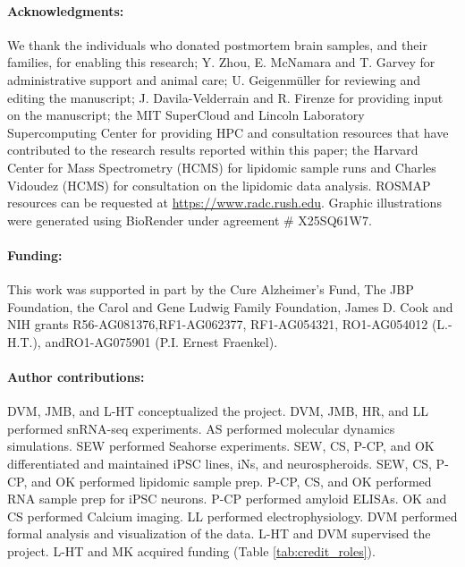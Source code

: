 \paragraph{Acknowledgments:} We thank the individuals who donated postmortem brain samples, and their families, for enabling this research; Y. Zhou, E. McNamara and T. Garvey for administrative support and animal care; U. Geigenmüller for reviewing and editing the manuscript; J. Davila-Velderrain and R. Firenze for providing input on the manuscript; the MIT SuperCloud and Lincoln Laboratory Supercomputing Center for providing HPC and consultation resources that have contributed to the research results reported within this paper; the Harvard Center for Mass Spectrometry (HCMS) for lipidomic sample runs and Charles Vidoudez (HCMS) for consultation on the lipidomic data analysis. ROSMAP resources can be requested at \url{https://www.radc.rush.edu}. Graphic illustrations were generated using BioRender under agreement \# X25SQ61W7.

\paragraph{Funding:} This work was supported in part by the Cure Alzheimer’s Fund, The JBP Foundation, the Carol and Gene Ludwig Family Foundation, James D. Cook and NIH grants R56-AG081376,RF1-AG062377, RF1-AG054321, RO1-AG054012 (L.-H.T.), andRO1-AG075901 (P.I. Ernest Fraenkel).

\paragraph{Author contributions:} DVM, JMB, and L-HT conceptualized the project. DVM, JMB, HR, and LL performed snRNA-seq experiments. AS performed molecular dynamics simulations. SEW performed Seahorse experiments. SEW, CS, P-CP, and OK differentiated and maintained iPSC lines, iNs, and neurospheroids. SEW, CS, P-CP, and OK performed lipidomic sample prep. P-CP, CS, and OK performed RNA sample prep for iPSC neurons. P-CP performed amyloid ELISAs. OK and CS performed Calcium imaging. LL performed electrophysiology. DVM performed formal analysis and visualization of the data. L-HT and DVM supervised the project. L-HT and MK acquired funding (Table \ref{tab:credit_roles}).


